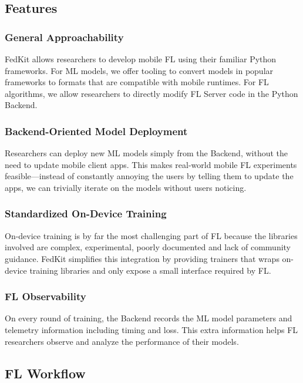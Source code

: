 \documentclass[letterpaper]{article} %
\begin{document}
\subsection{Features}

\subsubsection{General Approachability}
FedKit allows researchers to develop mobile FL
using their familiar Python frameworks.
For ML models, we offer tooling to convert models in popular frameworks to
formats that are compatible with mobile runtimes.
For FL algorithms, we allow researchers to directly modify FL Server code in
the Python Backend.

\newcommand{\backendorin}{Backend-Oriented Model Deployment}
\subsubsection{\backendorin}
Researchers can deploy new ML models simply from the Backend,
without the need to update mobile client apps.
This makes real-world mobile FL experiments feasible---instead of constantly
annoying the users by telling them to update the apps,
we can trivially iterate on the models without users noticing.

\subsubsection{Standardized On-Device Training}
On-device training is by far the most challenging part of FL because
the libraries involved are complex, experimental, poorly documented
and lack of community guidance.
FedKit simplifies this integration by providing trainers
that wraps on-device training libraries and
only expose a small interface required by FL.

\subsubsection{FL Observability}
On every round of training, the Backend records the ML model parameters and
telemetry information including timing and loss.
This extra information helps FL researchers observe and analyze
the performance of their models.

\subsection{FL Workflow}
\end{document}
